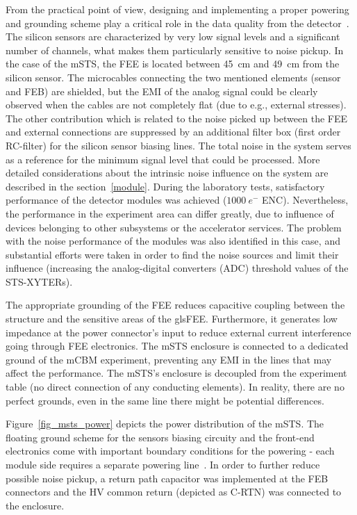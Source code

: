From the practical point of view, designing and implementing a proper powering and grounding scheme play a critical role in the data quality from the detector~\cite{Bobillier:1159563}. The silicon sensors are characterized by very low signal levels and a significant number of channels, what makes them particularly sensitive to noise pickup. In the case of the \gls{mSTS}, the \gls{FEE} is located between 45~cm and 49~cm from the silicon sensor. The microcables connecting the two mentioned elements (sensor and \gls{FEB}) are shielded, but the \gls{EMI} of the analog signal could be clearly observed when the cables are not completely flat (due to e.g., external stresses). The other contribution which is related to the noise picked up between the \gls{FEE} and external connections are suppressed by an additional filter box (first order RC-filter) for the silicon sensor biasing lines. The total noise in the system serves as a reference for the minimum signal level that could be processed. More detailed considerations about the intrinsic noise influence on the system are described in the section~\ref{module}. During the laboratory tests, satisfactory performance of the detector modules was achieved ($1000~e^{-}$ \gls{ENC}). Nevertheless, the performance in the experiment area can differ greatly, due to influence of devices belonging to other subsystems or the accelerator services. The problem with the noise performance of the modules was also identified in this case, and substantial efforts were taken in order to find the noise sources and limit their influence (increasing the analog-digital converters (\gls{ADC}) threshold values of the STS-XYTERs). 

The appropriate grounding of the FEE reduces capacitive coupling between the structure and the sensitive areas of the glsFEE. Furthermore, it generates low impedance at the power connector's input to reduce external current interference going through FEE electronics. The \gls{mSTS} enclosure is connected to a dedicated ground of the \gls{mCBM} experiment, preventing any \gls{EMI} in the lines that may affect the performance. The \gls{mSTS}'s enclosure is decoupled from the experiment table (no direct connection of any conducting elements). In reality, there are no perfect grounds, even in the same line there might be potential differences. 

Figure~\ref{fig_msts_power} depicts the power distribution of the \gls{mSTS}. The floating ground scheme for the sensors biasing circuity and the front-end electronics come with important boundary conditions for the powering - each module side requires a separate powering line~\cite{RodriguezRodriguez2020}. In order to further reduce possible noise pickup, a return path capacitor was implemented at the \gls{FEB} connectors and the \gls{HV} common return (depicted as C-RTN) was connected to the enclosure.

